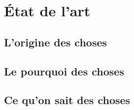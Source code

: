 \chapter{État de l'art}
\minitoc

\section{L'origine des choses}
\blindtext[10]


\section{Le pourquoi des choses}
\blindtext[10]

\section{Ce qu'on sait des choses}
\blindtext[10]